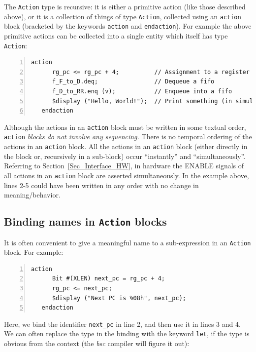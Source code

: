 The \verb|Action| type is recursive: it is either a primitive action
(like those described above), or it is a collection of things of type
\verb|Action|, collected using an \verb|action| block (bracketed by
the {\BSV} keywords \verb|action| and \verb|endaction|).  For example the
above primitive actions can be collected into a single entity which
itself has type \verb|Action|:

{\footnotesize
\begin{Verbatim}[frame=single, numbers=left]
   action
      rg_pc <= rg_pc + 4;          // Assignment to a register
      f_F_to_D.deq;                // Dequeue a fifo
      f_D_to_RR.enq (v);           // Enqueue into a fifo
      $display ("Hello, World!");  // Print something (in simulation only)
   endaction
\end{Verbatim}
}

Although the actions in an \verb|action| block must be written in some
textual order, \verb|action| \emph{blocks do not involve any
sequencing.}  There is no temporal ordering of the actions in an
\verb|action| block.  All the actions in an \verb|action| block
(either directly in the block or, recursively in a sub-block) occur
``instantly'' and ``simultaneously''.  Referring to
Section~\ref{Sec_Interface_HW}, in hardware the ENABLE signals of all
actions in an \verb|action| block are asserted simultaneously.  In the
example above, lines 2-5 could have been written in any order with no
change in meaning/behavior.


\subsection{Binding names in {\tt Action} blocks}


It is often convenient to give a meaningful name to a sub-expression
in an {\tt Action} block.  For example:

{\footnotesize
\begin{Verbatim}[frame=single, numbers=left]
   action
      Bit #(XLEN) next_pc = rg_pc + 4;
      rg_pc <= next_pc;
      $display ("Next PC is %08h", next_pc);
   endaction
\end{Verbatim}
}

Here, we bind the identifier \verb|next_pc| in line 2, and then use it
in lines 3 and 4.  We can often replace the type in the binding with
the keyword {\tt let}, if the type is obvious from the context (the
\emph{bsc} compiler will figure it out):

